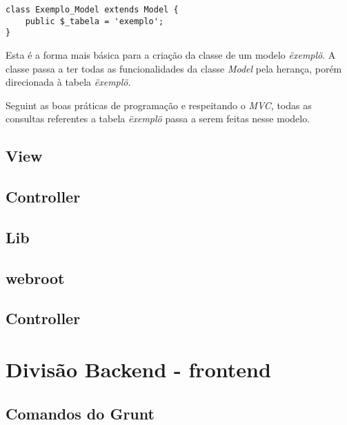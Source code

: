 \begin{lstlisting}
class Exemplo_Model extends Model {
    public $_tabela = 'exemplo';
}
\end{lstlisting}

            Esta é a forma mais básica para a criação da classe de um modelo \emph{\"exemplo\"}. A classe passa a ter todas as funcionalidades da classe \emph{Model} pela herança, porém direcionada à tabela \emph{\"exemplo\"}.

            Seguint as boas práticas de programação e respeitando o \emph{MVC}, todas as consultas referentes a tabela \emph{\"exemplo\"} passa a serem feitas nesse modelo.


        \subsection{View\label{sec:app-view}}

        \subsection{Controller\label{sec:app-controller}}

        \subsection{Lib\label{sec:app-lib}}

        \subsection{webroot\label{sec:app-lib}}


        \subsection{Controller\label{sec:app-controller}}


    \section{Divisão Backend - frontend\label{sec:back-front}}


        \subsection{Comandos do Grunt\label{sub:comandos-grunt}}
